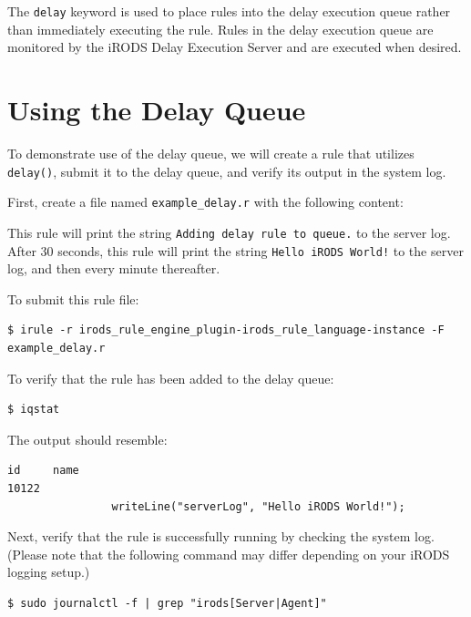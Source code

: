 \documentclass[10pt,oneside]{memoir}
\begin{document}
The \texttt{delay} keyword is used to place rules into the delay execution queue rather than immediately executing the rule. Rules in the delay execution queue are monitored by the iRODS Delay Execution Server and are executed when desired.

\section{Using the Delay Queue}

To demonstrate use of the delay queue, we will create a rule that utilizes \texttt{delay()}, submit it to the delay queue, and verify its output in the system log.

First, create a file named \texttt{example\_delay.r} with the following content:

\begin{lrbox}{\exampleDelayRule}

\end{lrbox}
\href{https://raw.githubusercontent.com/irods/irods_training/ugm2025/beginner/example_delay.r}{\usebox{\exampleDelayRule}}

This rule will print the string \texttt{Adding delay rule to queue.} to the server log. After 30 seconds, this rule will print the string \texttt{Hello iRODS World!} to the server log, and then every minute thereafter.

To submit this rule file:

\begin{lstlisting}
$ irule -r irods_rule_engine_plugin-irods_rule_language-instance -F example_delay.r
\end{lstlisting}

To verify that the rule has been added to the delay queue:

\begin{lstlisting}
$ iqstat
\end{lstlisting}

The output should resemble:
\begin{lstlisting}
id     name
10122  
                writeLine("serverLog", "Hello iRODS World!");
\end{lstlisting}

Next, verify that the rule is successfully running by checking the system log. (Please note that the following command may differ depending on your iRODS logging setup.)

\begin{lstlisting}
$ sudo journalctl -f | grep "irods[Server|Agent]"
\end{lstlisting}
\end{document}
